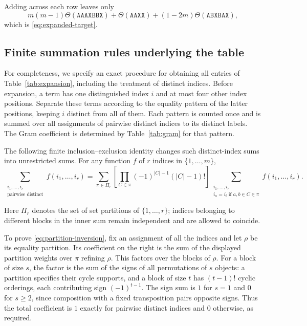 \documentclass[11pt]{article}
\newcommand{\word}[1]{\mathtt{#1}}
\begin{document}
Adding across each row leaves only
\[
 m(m-1)\Theta(\word{AAAXBBX})
 +\Theta(\word{AAXX})
 +(1-2m)\Theta(\word{ABXBAX}),
\]
which is \eqref{eq:expanded-target}.

\subsection{Finite summation rules underlying the table}

For completeness, we specify an exact procedure for obtaining all
entries of Table~\ref{tab:expansion}, including the treatment of
distinct indices. Before expansion, a term has one distinguished index
\(i\) and at most four other index positions. Separate these terms
according to the equality pattern of the latter positions, keeping
\(i\) distinct from all of them. Each pattern is counted once and is
summed over all assignments of pairwise distinct indices to its
distinct labels. The Gram coefficient is determined by
Table~\ref{tab:gram} for that pattern.

The following finite inclusion--exclusion identity changes such
distinct-index sums into unrestricted sums. For any function \(f\) of
\(r\) indices in \(\{1,\ldots,m\}\),
\begin{equation}\label{eq:partition-inversion}
 \sum_{\substack{i_1,\ldots,i_r\\\text{pairwise distinct}}}
 f(i_1,\ldots,i_r)
 =
 \sum_{\pi\in\Pi_r}
 \left[\prod_{C\in\pi}(-1)^{|C|-1}(|C|-1)!\right]
 \sum_{\substack{i_1,\ldots,i_r\\
       i_a=i_b\ \text{if }a,b\in C\in\pi}}
 f(i_1,\ldots,i_r).
\end{equation}

Here \(\Pi_r\) denotes the set of set partitions of \(\{1,\ldots,r\}\);
indices belonging to different blocks in the inner sum remain
independent and are allowed to coincide.

To prove \eqref{eq:partition-inversion}, fix an assignment of all the
indices and let \(\rho\) be its equality partition. Its coefficient on
the right is the sum of the displayed partition weights over
\(\pi\) refining \(\rho\). This factors over the blocks of \(\rho\).
For a block of size \(s\), the factor is the sum of the signs of all
permutations of \(s\) objects: a partition specifies their cycle
supports, and a block of size \(t\) has \((t-1)!\) cyclic orderings,
each contributing sign \((-1)^{t-1}\).
The sign sum is \(1\) for \(s=1\) and \(0\) for \(s\ge2\), since
composition with a fixed transposition pairs opposite signs.
Thus the total coefficient is \(1\) exactly for pairwise distinct
indices and \(0\) otherwise, as required.
\end{document}
